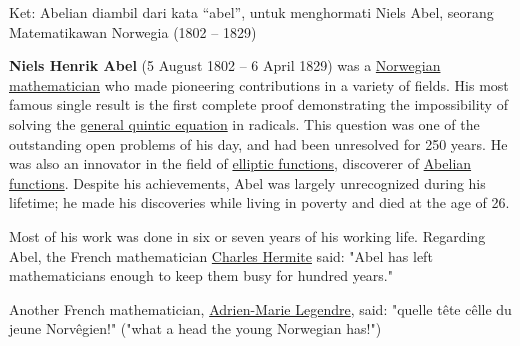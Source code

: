 \documentclass{article}
\begin{document}
\vspace{10mm}

Ket: Abelian diambil dari kata ``abel'', untuk menghormati Niels Abel, seorang Matematikawan Norwegia (1802 -- 1829)

\newpage


\textbf{Niels Henrik Abel} (5 August 1802 -- 6 April 1829) was a \href{https://en.wikipedia.org/wiki/Norwegian}{Norwegian} \href{https://en.wikipedia.org/wiki/Mathematician}{mathematician} who made pioneering contributions in a variety of fields. His most famous single result is the first complete proof demonstrating the impossibility of solving the \href{https://en.wikipedia.org/wiki/Quintic_equation}{general quintic equation} in radicals. This question was one of the outstanding open problems of his day, and had been unresolved for 250 years. He was also an innovator in the field of \href{https://en.wikipedia.org/wiki/Elliptic_function}{elliptic functions}, discoverer of \href{https://en.wikipedia.org/wiki/Abelian_function}{Abelian functions}. Despite his achievements, Abel was largely unrecognized during his lifetime; he made his discoveries while living in poverty and died at the age of 26.

Most of his work was done in six or seven years of his working life.\cite{1} Regarding Abel, the French mathematician \href{https://en.wikipedia.org/wiki/Charles_Hermite}{Charles Hermite} said: "Abel has left mathematicians enough to keep them busy for hundred years.\cite{1}\cite{2}"

\vspace{93.56mm}

Another French mathematician, \href{https://en.wikipedia.org/wiki/Adrien-Marie_Legendre}{Adrien-Marie Legendre}, said: "quelle t\^ete c\^elle du jeune Norv\^egien!" ("what a head the young Norwegian has!")\cite{3}

\vspace{10mm}
\end{document}
